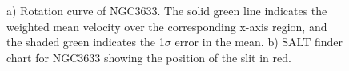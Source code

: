 \documentclass[iop]{emulateapj-rtx4}
\begin{document}
\begin{figure}[t!]
\centering
  \caption{\small{a) Rotation curve of NGC3633. The solid green line indicates the weighted mean velocity over the corresponding x-axis region, and the shaded green indicates the 1$\sigma$ error in the mean. b) SALT finder chart for NGC3633 showing the position of the slit in red.}}
\vspace{5pt}
\end{figure}
\end{document}
